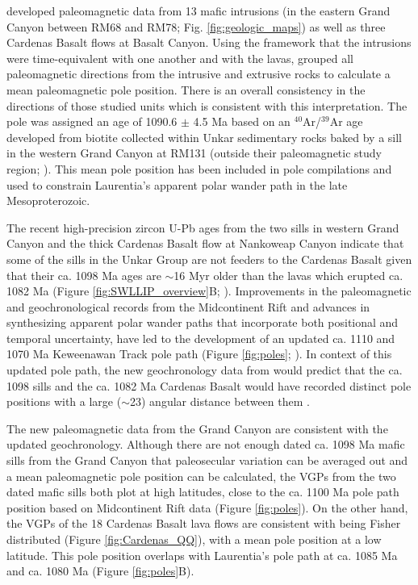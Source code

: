 \cite{Weil2003a} developed paleomagnetic data from 13 mafic intrusions (in the eastern Grand Canyon between RM68 and RM78; Fig. \ref{fig:geologic_maps}) as well as three Cardenas Basalt flows at Basalt Canyon. Using the framework that the intrusions were time-equivalent with one another and with the lavas, \cite{Weil2003a} grouped all paleomagnetic directions from the intrusive and extrusive rocks to calculate a mean paleomagnetic pole position. There is an overall consistency in the directions of those studied units which is consistent with this interpretation. The pole was assigned an age of 1090.6 $\pm$ 4.5 Ma based on an $^{40}$Ar/$^{39}$Ar age developed from biotite collected within Unkar sedimentary rocks baked by a sill in the western Grand Canyon at RM131 (outside their paleomagnetic study region; \citealp{Weil2003a}). This mean pole position has been included in pole compilations \cite[e.g.][]{Evans2021a} and used to constrain Laurentia's apparent polar wander path in the late Mesoproterozoic. 

The recent high-precision zircon U-Pb ages from the two sills in western Grand Canyon and the thick Cardenas Basalt flow at Nankoweap Canyon indicate that some of the sills in the Unkar Group are not feeders to the Cardenas Basalt given that their ca. 1098 Ma ages are $\sim$16 Myr older than the lavas which erupted ca. 1082 Ma (Figure \ref{fig:SWLLIP_overview}B; \citealp{Mohr2024a}). Improvements in the paleomagnetic and geochronological records from the Midcontinent Rift \cite[e.g.][]{Tauxe2009a, Kulakov2013b, Fairchild2017a, Swanson-Hysell2019a} and advances in synthesizing apparent polar wander paths that incorporate both positional and temporal uncertainty, have led to the development of an updated ca. 1110 and 1070 Ma Keweenawan Track pole path (Figure \ref{fig:poles}; \citealp{Swanson-Hysell2019a, Rose2022a}). In context of this updated pole path, the new geochronology data from \cite{Mohr2024a} would predict that the ca. 1098 sills and the ca. 1082 Ma Cardenas Basalt would have recorded distinct pole positions with a large ($\sim$23\textdegree) angular distance between them \citep{Swanson-Hysell2019a, Rose2022a}. 

The new paleomagnetic data from the Grand Canyon are consistent with the updated geochronology. Although there are not enough dated ca. 1098 Ma mafic sills from the Grand Canyon that paleosecular variation can be averaged out and a mean paleomagnetic pole position can be calculated, the VGPs from the two dated mafic sills both plot at high latitudes, close to the ca. 1100 Ma pole path position based on Midcontinent Rift data (Figure \ref{fig:poles}). On the other hand, the VGPs of the 18 Cardenas Basalt lava flows are consistent with being Fisher distributed (Figure \ref{fig:Cardenas_QQ}), with a mean pole position at a low latitude. This pole position overlaps with Laurentia's pole path at ca. 1085 Ma and ca. 1080 Ma (Figure \ref{fig:poles}B). 


